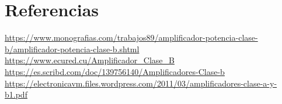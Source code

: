 \documentclass[10pt,a4paper]{article}
\begin{document}
\section{Referencias}
\url{https://www.monografias.com/trabajos89/amplificador-potencia-clase-b/amplificador-potencia-clase-b.shtml}
\url{https://www.ecured.cu/Amplificador_Clase_B}
\url{https://es.scribd.com/doc/139756140/Amplificadores-Clase-b}
\url{https://electronicavm.files.wordpress.com/2011/03/amplificadores-clase-a-y-b1.pdf}
\end{document}
